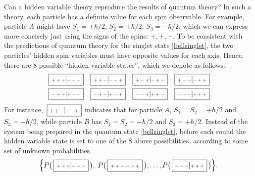 \documentclass[pra,12pt]{revtex4-2}
\def\hvbox[#1]#2{\,\boxed{\scalebox{0.7}{$\,#1$}|\scalebox{0.7}{$#2\,$}}}
\begin{document}
Can a hidden variable theory reproduce the results of quantum theory?
In such a theory, each particle has a definite value for each spin
observable.  For example, particle $A$ might have $S_1 = +\hbar/2, \,
S_2 = +\hbar/2, \, S_3 = -\hbar/2$, which we can express more
concisely just using the signs of the spins: $+, +, -$.  To be
consistent with the predictions of quantum theory for the singlet
state \eqref{bellsinglet}, the two particles' hidden spin variables
must have opposite values for each axis.  Hence, there are $8$
possible ``hidden variable states'', which we denote as follows:
\begin{align*}
  \begin{aligned}
    \hvbox[+++]{---} \;\;\;
    \hvbox[++-]{--+} \;\;\;
    \hvbox[+-+]{-+-} \;\;\;
    \hvbox[+--]{-++}\\
    \hvbox[-++]{+--} \;\;\;
    \hvbox[-+-]{+-+} \;\;\;
    \hvbox[--+]{++-} \;\;\;
    \hvbox[---]{+++}
  \end{aligned}
\end{align*}
For instance, $\hvbox[++-]{--+}$ indicates that for particle $A$, $S_1
= S_2 = +\hbar/2$ and $S_3 = -\hbar/2$, while particle $B$ has $S_1 =
S_2 = -\hbar/2$ and $S_3 = +\hbar/2$.  Instead of the system being
prepared in the quantum state \eqref{bellsinglet}, before each round
the hidden variable state is set to one of the 8 above possibilities,
according to some set of unknown probabilities
\begin{equation*}
  \Big\{ P\big(\hvbox[+++]{---}\,\big), \;P\big(\hvbox[++-]{--+}\,\big),
  \dots, P\big(\hvbox[---]{+++}\,\big) \Big\}.
\end{equation*}
\end{document}
